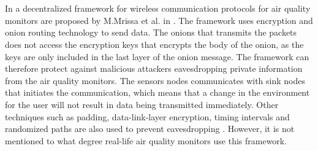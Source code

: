 \\\\
In a decentralized framework for wireless communication protocols for air quality monitors are proposed by M.Mrissa et al. in \cite{PrivacyAndFrameworkDecentAQM}. The framework uses encryption and onion routing technology to send data. The onions that transmits the packets does not access the encryption keys that encrypts the body of the onion, as the keys are only included in the last layer of the onion message. The framework can therefore protect against malicious attackers eavesdropping private information from the air quality monitors. The sensors nodes communicates with sink nodes that initiates the communication, which means that a change in the environment for the user will not result in data being transmitted immediately. Other techniques such as padding, data-link-layer encryption, timing intervals and randomized paths are also used to prevent eavesdropping \cite{PrivacyAndFrameworkDecentAQM}. However, it is not mentioned to what degree real-life air quality monitors use this framework. 
\\\\
